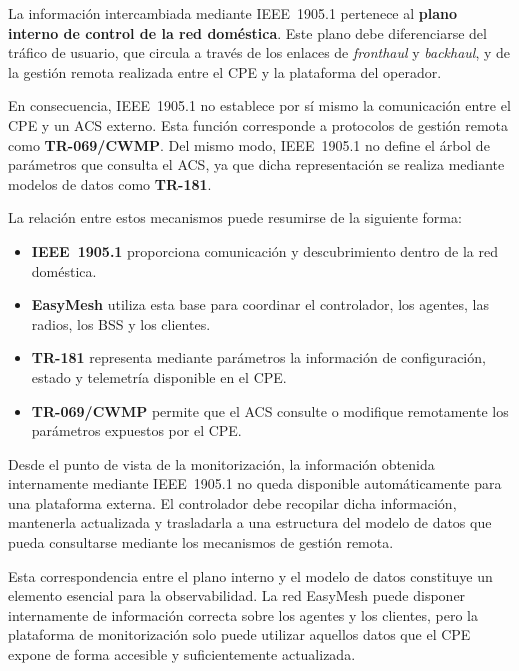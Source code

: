 La información intercambiada mediante IEEE~1905.1 pertenece al
\textbf{plano interno de control de la red doméstica}. Este plano debe
diferenciarse del tráfico de usuario, que circula a través de los enlaces
de \textit{fronthaul} y \textit{backhaul}, y de la gestión remota
realizada entre el CPE y la plataforma del operador.

En consecuencia, IEEE~1905.1 no establece por sí mismo la comunicación
entre el CPE y un ACS externo. Esta función corresponde a protocolos de
gestión remota como \textbf{TR-069/CWMP}. Del mismo modo, IEEE~1905.1 no
define el árbol de parámetros que consulta el ACS, ya que dicha
representación se realiza mediante modelos de datos como
\textbf{TR-181}.

La relación entre estos mecanismos puede resumirse de la siguiente
forma:

\begin{itemize}
    \item \textbf{IEEE~1905.1} proporciona comunicación y descubrimiento
    dentro de la red doméstica.

    \item \textbf{EasyMesh} utiliza esta base para coordinar el
    controlador, los agentes, las radios, los BSS y los clientes.

    \item \textbf{TR-181} representa mediante parámetros la información
    de configuración, estado y telemetría disponible en el CPE.

    \item \textbf{TR-069/CWMP} permite que el ACS consulte o modifique
    remotamente los parámetros expuestos por el CPE.
\end{itemize}

Desde el punto de vista de la monitorización, la información obtenida
internamente mediante IEEE~1905.1 no queda disponible automáticamente
para una plataforma externa. El controlador debe recopilar dicha
información, mantenerla actualizada y trasladarla a una estructura del
modelo de datos que pueda consultarse mediante los mecanismos de gestión
remota.

Esta correspondencia entre el plano interno y el modelo de datos
constituye un elemento esencial para la observabilidad. La red EasyMesh
puede disponer internamente de información correcta sobre los agentes y
los clientes, pero la plataforma de monitorización solo puede utilizar
aquellos datos que el CPE expone de forma accesible y suficientemente
actualizada.

